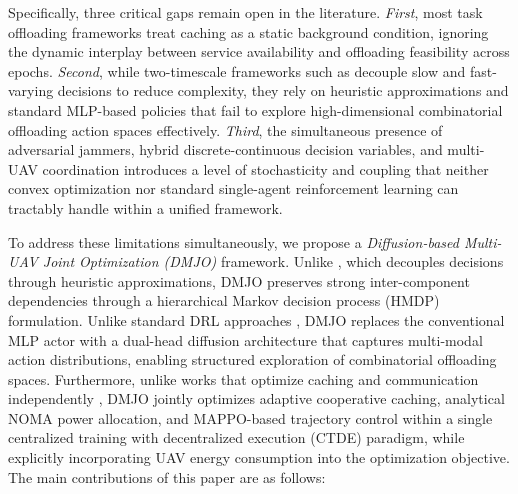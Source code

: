 \documentclass[journal]{IEEEtran}
\begin{document}
Specifically, three critical gaps remain open in the 
literature. \textit{First}, most task offloading 
frameworks \cite{yang2026drl, tariq2024toward} 
treat caching as a static background condition, ignoring 
the dynamic interplay between service availability and 
offloading feasibility across epochs. \textit{Second}, 
while two-timescale frameworks such as \cite{TJCCT} 
decouple slow and fast-varying decisions to reduce 
complexity, they rely on heuristic approximations and 
standard MLP-based policies that fail to explore 
high-dimensional combinatorial offloading action spaces 
effectively. \textit{Third}, the simultaneous presence 
of adversarial jammers, hybrid discrete-continuous 
decision variables, and multi-UAV coordination 
introduces a level of stochasticity and coupling that 
neither convex optimization \cite{barman2025joint} nor 
standard single-agent reinforcement learning 
\cite{yang2026drl} can tractably handle within a 
unified framework.

To address these limitations simultaneously, we propose 
a \textit{Diffusion-based Multi-UAV Joint Optimization 
(DMJO)} framework. Unlike \cite{TJCCT}, which 
decouples decisions through heuristic approximations, 
DMJO preserves strong inter-component dependencies 
through a hierarchical Markov decision process (HMDP) 
formulation. Unlike standard DRL approaches 
\cite{kang2023cooperative}, DMJO replaces the 
conventional MLP actor with a dual-head diffusion 
architecture that captures multi-modal action 
distributions, enabling structured exploration of 
combinatorial offloading spaces. Furthermore, unlike 
works that optimize caching and communication 
independently \cite{xu2026cooperative, qin2024drl}, 
DMJO jointly optimizes adaptive cooperative caching, 
analytical NOMA power allocation, and MAPPO-based 
trajectory control within a single centralized training 
with decentralized execution (CTDE) paradigm, while 
explicitly incorporating UAV energy consumption into 
the optimization objective.
The main contributions of this paper are as follows:
\end{document}
